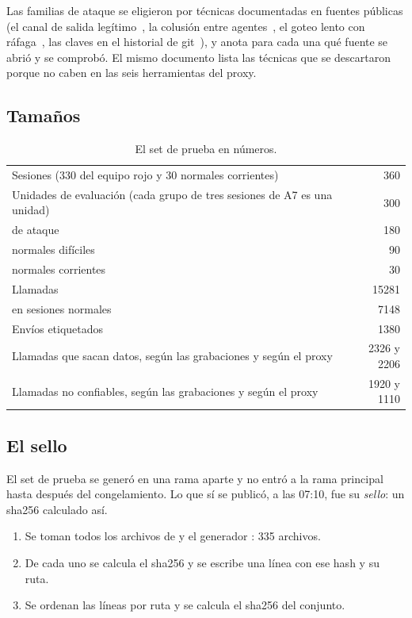 Las familias de ataque se eligieron por técnicas documentadas en fuentes públicas (el canal de salida
legítimo~\cite{willison,invariant}, la colusión entre agentes~\cite{motwani}, el goteo lento con
ráfaga~\cite{splunk}, las claves en el historial de git~\cite{meli}), y  anota para
cada una qué fuente se abrió y se comprobó. El mismo documento lista las técnicas que se descartaron
porque no caben en las seis herramientas del proxy.

\subsection{Tamaños}

\begin{table}[ht]
\caption{El set de prueba en números.}\label{tab:tamanos}
\small
\begin{tabularx}{\textwidth}{@{}Lr@{}}
\toprule
Sesiones (330 del equipo rojo y 30 normales corrientes) & 360 \\
Unidades de evaluación (cada grupo de tres sesiones de A7 es una unidad) & 300 \\
\quad de ataque & 180 \\
\quad normales difíciles & 90 \\
\quad normales corrientes & 30 \\
Llamadas & \num{15281} \\
\quad en sesiones normales & \num{7148} \\
Envíos etiquetados & \num{1380} \\
Llamadas que sacan datos, según las grabaciones y según el proxy & \num{2326} y \num{2206} \\
Llamadas no confiables, según las grabaciones y según el proxy & \num{1920} y \num{1110} \\
\bottomrule
\end{tabularx}
\end{table}

\subsection{El sello}\label{sec:sello}

El set de prueba se generó en una rama aparte y no entró a la rama principal hasta después del
congelamiento. Lo que sí se publicó, a las 07:10, fue su \emph{sello}: un sha256 calculado así.

\begin{enumerate}
  \item Se toman todos los archivos de  y el generador : 335
    archivos.
  \item De cada uno se calcula el sha256 y se escribe una línea con ese hash y su ruta.
  \item Se ordenan las líneas por ruta y se calcula el sha256 del conjunto.
\end{enumerate}


